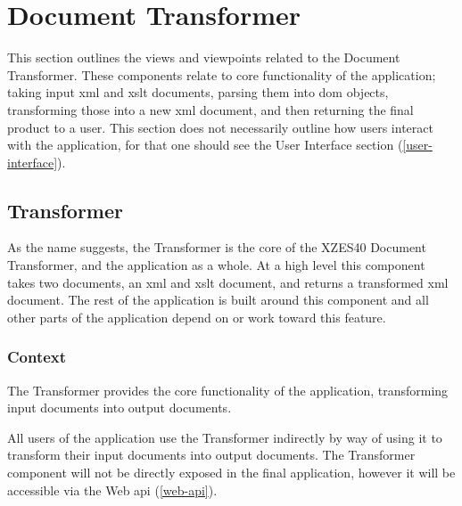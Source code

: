 \section{Document Transformer}
\label{document-transformer}

This section outlines the views and viewpoints related to the Document Transformer.
These components relate to core functionality of the application; taking input \gls{xml} and \gls{xslt} documents, parsing them into \gls{dom} objects, transforming those into a new \gls{xml} document, and then returning the final product to a user.
This section does not necessarily outline how users interact with the application, for that one should see the User Interface section (\ref{user-interface}).

\subsection{Transformer}
\label{transformer}

As the name suggests, the Transformer is the core of the XZES40 Document Transformer, and the application as a whole.
At a high level this component takes two documents, an \gls{xml} and \gls{xslt} document, and returns a transformed \gls{xml} document.
The rest of the application is built around this component and all other parts of the application depend on or work toward this feature.

\subsubsection{Context}

The Transformer provides the core functionality of the application, transforming input documents into output documents.

All users of the application use the Transformer indirectly by way of using it to transform their input documents into output documents.
The Transformer component will not be directly exposed in the final application, however it will be accessible via the Web \gls{api} (\ref{web-api}).

